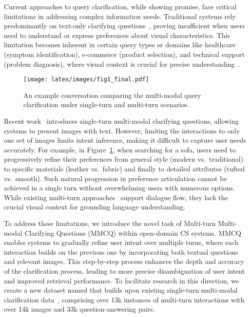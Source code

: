 \documentclass[11pt]{article}
\begin{document}
Current approaches to query clarification, while showing promise, face critical limitations in addressing complex information needs. Traditional systems rely predominantly on text-only clarifying questions~\cite{aliannejadidialogue,zamani-2020-generating}, proving insufficient when users need to understand or express preferences about visual characteristics. This limitation becomes inherent in certain query types or domains like healthcare (symptom identification), e-commerce (product selection), and technical support (problem diagnosis), where visual context is crucial for precise understanding~\citep{chiir-siro}.
\begin{figure}[t]
  \texttt{[image: latex/images/fig1\_final.pdf]}
  \caption{An example conversation comparing the multi-modal query clarification under single-turn and multi-turn scenarios.}\label{fig:fig1}
\end{figure}

Recent work~\cite{yuan2024askingmultimodalclarifyingquestions}  introduces single-turn multi-modal clarifying questions, allowing systems to present images with text. However, limiting the interactions to only one set of images limits intent inference, making it difficult to capture user needs accurately. For example, in Figure~\ref{fig:fig1}, when searching for a sofa, users need to progressively refine their preferences from general style (modern vs.\ traditional) to specific materials (leather vs.\ fabric) and finally to detailed attributes (tufted vs.\ smooth). Such natural progression in preference articulation cannot be achieved in a single turn without overwhelming users with numerous options. While existing multi-turn approaches~\cite{DBLP:journals/corr/abs-2009-11352} support dialogue flow, they lack the crucial visual context for grounding language understanding.

To address these limitations, we introduce the novel task of Multi-turn Multi-modal Clarifying Questions (MMCQ) within open-domain \ac{CS} systems. 
MMCQ enables systems to gradually refine user intent over multiple turns, where each interaction builds on the previous one by incorporating both textual questions and relevant images. This step-by-step process enhances the depth and accuracy of the clarification process, leading to more precise disambiguation of user intent and improved retrieval performance.
To facilitate research in this direction, we create a new dataset named \OurData{} that builds upon existing single-turn multi-modal clarification data~\cite{yuan2024askingmultimodalclarifyingquestions}, comprising over 13k instances of multi-turn interactions with over 14k images and 33k question-answering pairs. 
\end{document}
